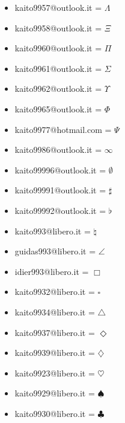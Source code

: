 \documentclass[12pt, a4paper] {article} %
\begin{document}
\begin{itemize}
		\item kaito9957@outlook.it = $\varLambda$ \\
		\item kaito9958@outlook.it = $\varXi$ \\
		\item kaito9960@outlook.it = $\varPi$ \\
		\item kaito9961@outlook.it = $\varSigma$ \\
		\item kaito9962@outlook.it = $\varUpsilon$ \\
		\item kaito9965@outlook.it = $\varPhi$ \\
		\item kaito9977@hotmail.com = $\varPsi$ \\
		\item kaito9986@outlook.it = $\infty$ \\
		\item kaito99996@outlook.it = $\emptyset$ \\
		\item kaito99991@outlook.it = $\sharp$ \\
		\item kaito99992@outlook.it = $\flat$ \\
		\item kaito993@libero.it = $\natural$ \\
		\item guidas993@libero.it = $\angle$ \\
		\item idier993@libero.it = $\Box$ \\
		\item kaito9932@libero.it = $\square$ \\
		\item kaito9934@libero.it = $\triangle$ \\
		\item kaito9937@libero.it = $\Diamond$ \\
		\item kaito9939@libero.it = $\diamondsuit$ \\
		\item kaito9923@libero.it = $\heartsuit$ \\
		\item kaito9929@libero.it = $\spadesuit$ \\
		\item kaito9930@libero.it = $\clubsuit$ \\

\end{itemize}
\end{document}
